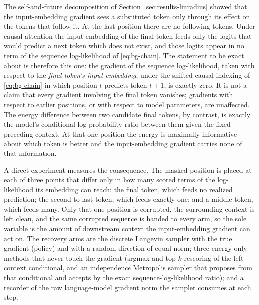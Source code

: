 The self-and-future decomposition of Section~\ref{sec:results-linradius} showed that the input-embedding gradient sees a substituted token only through its effect on the tokens that follow it. At the last position there are no following tokens. Under causal attention the input embedding of the final token feeds only the logits that would predict a next token which does not exist, and those logits appear in no term of the sequence log-likelihood of \eqref{eq:bg-chain}. The statement to be exact about is therefore this one: the gradient of the sequence log-likelihood, taken with respect to the \emph{final token's input embedding}, under the shifted causal indexing of \eqref{eq:bg-chain} in which position $t$ predicts token $t+1$, is exactly zero. It is not a claim that every gradient involving the final token vanishes; gradients with respect to earlier positions, or with respect to model parameters, are unaffected. The energy difference between two candidate final tokens, by contrast, is exactly the model's conditional log-probability ratio between them given the fixed preceding context. At that one position the energy is maximally informative about which token is better and the input-embedding gradient carries none of that information.

A direct experiment measures the consequence. The masked position is placed at each of three points that differ only in how many scored terms of the log-likelihood its embedding can reach: the final token, which feeds no realized prediction; the second-to-last token, which feeds exactly one; and a middle token, which feeds many. Only that one position is corrupted, the surrounding context is left clean, and the same corrupted sequence is handed to every arm, so the sole variable is the amount of downstream context the input-embedding gradient can act on. The recovery arms are the discrete Langevin sampler with the true gradient (policy) and with a random direction of equal norm; three energy-only methods that never touch the gradient (argmax and top-$k$ rescoring of the left-context conditional, and an independence Metropolis sampler that proposes from that conditional and accepts by the exact sequence-log-likelihood ratio); and a recorder of the raw language-model gradient norm the sampler consumes at each step.

